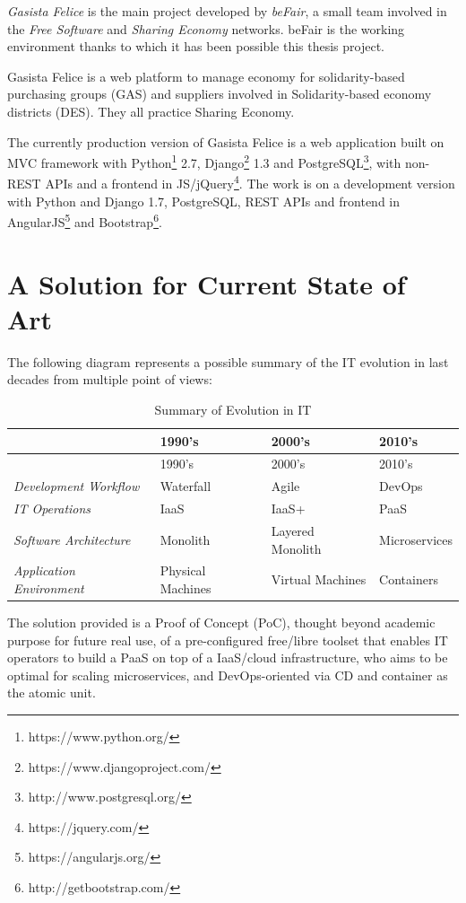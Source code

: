 \textit{Gasista Felice} is the main project developed by \textit{beFair}, a
small team involved in the \textit{Free Software} and \textit{Sharing
Economy} networks. beFair is the working environment thanks to which it
has been possible this thesis project.

Gasista Felice is a web platform to manage economy for solidarity-based
purchasing groups (GAS) and suppliers involved in Solidarity-based
economy districts (DES). They all practice Sharing Economy.

The currently production version of Gasista Felice is a web application
built on MVC framework with Python\footnote{https://www.python.org/} 2.7, Django\footnote{https://www.djangoproject.com/} 1.3 and PostgreSQL\footnote{http://www.postgresql.org/}, with
non-REST APIs and a frontend in JS/jQuery\footnote{https://jquery.com/}. The work is on a development
version with Python and Django 1.7, PostgreSQL, REST APIs and frontend
in AngularJS\footnote{https://angularjs.org/} and Bootstrap\footnote{http://getbootstrap.com/}.

\section{A Solution for Current State of
Art}\label{a-solution-for-current-state-of-art}

The following diagram represents a possible summary of the IT evolution
in last decades from multiple point of views:

\begin{longtable}[c]{@{}llll@{}}
\caption{Summary of Evolution in IT}\tabularnewline
\toprule
& 1990's & 2000's & 2010's\tabularnewline
\midrule
\endfirsthead
\toprule
& 1990's & 2000's & 2010's\tabularnewline
\midrule
\endhead
\textit{Development Workflow} & Waterfall & Agile & DevOps\tabularnewline
\textit{IT Operations} & IaaS & IaaS+ & PaaS\tabularnewline
\textit{Software Architecture} & Monolith & Layered Monolith &
Microservices\tabularnewline
\textit{Application Environment} & Physical Machines & Virtual Machines &
Containers\tabularnewline
\bottomrule
\end{longtable}

The solution provided is a Proof of Concept (PoC), thought beyond academic purpose for future real use, of a pre-configured free/libre toolset that enables IT operators to build a PaaS on top of a IaaS/cloud infrastructure, who aims to be optimal for scaling microservices, and DevOps-oriented via CD and container as the atomic unit.

